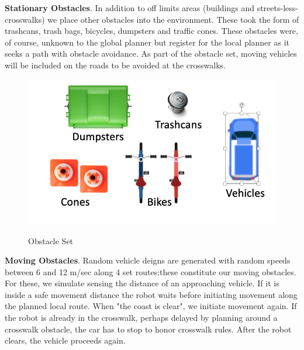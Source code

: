 \documentclass{article}
\begin{document}
\begin{multicols}{2}
\noindent \textbf{Stationary Obstacles}. In addition to off limits areas (buildings and streets-less-crosswalks) we place other obstacles into the environment.  These took the form of trashcans, trash bags, bicycles, dumpsters and traffic cones.  These obstacles were, of course, unknown to the global planner but register for the local planner as it seeks a path with obstacle avoidance.  As part of the obstacle set, moving vehicles will be included on the roads to be avoided at the crosswalks.
\begin{figure}[H]
   \centering
    \includegraphics[width = 1\columnwidth]{figures/obstacles.png}
     \label{fig:obstacles}
     \caption{Obstacle Set}
\end{figure}
\noindent \textbf{Moving Obstacles}. Random vehicle deigns are generated with random speeds between 6 and 12 m/sec along 4 set routes:these constitute our moving obstacles. For these, we simulate sensing the distance of an approaching vehicle.  If it is inside a safe movement distance the robot waits before initiating movement along the planned local route. When "the coast is clear", we initiate movement again.  If the robot is already in the crosswalk, perhaps delayed by planning around a crosswalk obstacle, the car has to stop to honor crosswalk rules.  After the robot clears, the vehicle proceeds again.\\


\end{multicols}
\end{document}
